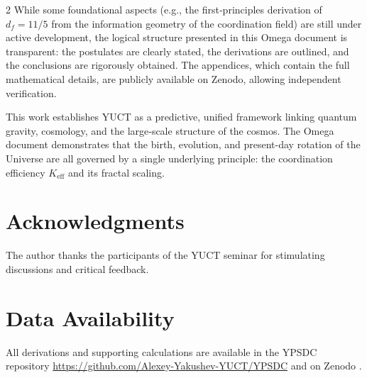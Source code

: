 \documentclass[12pt,a4paper]{article}
\begin{document}
\begin{multicols}{2}
		While some foundational aspects (e.g., the first‑principles derivation of \(d_f = 11/5\) from the information geometry of the coordination field) are still under active development, the logical structure presented in this Omega document is transparent: the postulates are clearly stated, the derivations are outlined, and the conclusions are rigorously obtained. The appendices, which contain the full mathematical details, are publicly available on Zenodo, allowing independent verification.
		
		This work establishes YUCT as a predictive, unified framework linking quantum gravity, cosmology, and the large‑scale structure of the cosmos. The Omega document demonstrates that the birth, evolution, and present-day rotation of the Universe are all governed by a single underlying principle: the coordination efficiency \(K_{\mathrm{eff}}\) and its fractal scaling.
		
	\end{multicols}
	
	\section*{Acknowledgments}
	
	The author thanks the participants of the YUCT seminar for stimulating discussions and critical feedback.
	
	\section*{Data Availability}
	
	All derivations and supporting calculations are available in the YPSDC repository \url{https://github.com/Alexey-Yakushev-YUCT/YPSDC} and on Zenodo \cite{AppendixL,AppendixY,AppendixP,AppendixM,AppendixΩ,AppendixB}.
	
\end{document}
